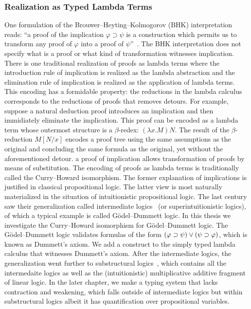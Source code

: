 \subsubsection{Realization as Typed Lambda Terms}

One formulation of the
Brouwer--Heyting--Kolmogorov
(BHK)
interpretation reads: ``a proof of the
implication $\varphi\supset\psi$ is a construction which permits us to
 transform any proof of $\varphi$ into a proof of $\psi$''~.
The BHK
interpretation does not specify what is a proof or what kind of
transformation witnesses implication.
There is one
traditional realization of proofs as lambda terms where the
introduction rule of implication is realized as the lambda abstraction
and the elimination rule of implication is realized as the application
of lambda terms.
This encoding has a formidable property:
the reductions in the lambda calculus corresponds to the reductions of
proofs that
removes detours.
For example, suppose a natural deduction proof introduces an implication and then
immidiately eliminate the
implication.  This proof can be encoded as a lambda term whose outermost
structure is a $\beta$-redex: $(\lambda x. M)N$.
 The result of the $\beta$-reduction $M[N/x]$ encodes a proof tree using
 the same assumptions as the original and concluding the same formula as
 the original, yet without the aforementioned detour.
 a proof of implication allows transformation of proofs
by means of
substitution.  The encoding of proofs as lambda terms is traditionally
called the Curry--Howard isomorphism.
The former explanation of implications is justified in classical propositional logic.
The latter view is most naturally materialized in the situation of
intuitionistic propositional logic.  The last century saw their
generalization called intermediate logics~\citep{umezawa} (or superintuitionistic
logics), of which a typical example is
called G\"odel--Dummett logic.
In this thesis we investigate the Curry--Howard isomorphism for
G\"odel--Dummett logic.  The G\"odel--Dummett
logic validates formulas
of the form $(\varphi\supset\psi)\lor(\psi\supset\varphi)$, which is known as
Dummett's axiom.  We add a construct to the simply typed lambda
calculus
that witnesses Dummett's axiom.
After the intermediate logics, the generalization went further to
substructural
logics~\citep{residuated}, which contains all the intermedaite logics as
well as the
(intuitionistic) multiplicative
additive fragment of linear logic.
In the later chapter, we make a typing system that lacks contraction and
weakening, which falls outside of intermediate logics but within
substructural logics albeit it has quantification over propositional variables.


